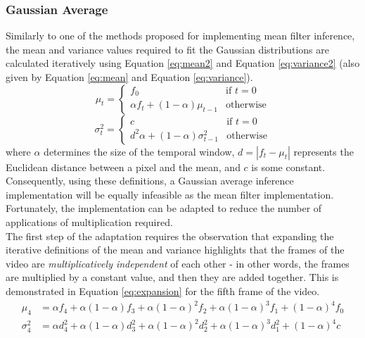 \setlength{\leftskip}{0cm}
\subsubsection{Gaussian Average}
\setlength{\leftskip}{0.5cm}
\indent \indent
Similarly to one of the methods proposed for implementing mean filter inference, the mean and variance values required to fit the Gaussian distributions are calculated iteratively using Equation \ref{eq:mean2} and Equation \ref{eq:variance2} (also given by Equation \ref{eq:mean} and Equation \ref{eq:variance}).
\begin{equation}
    \label{eq:mean2}
    \mu_t =
    \begin{cases}
        f_0 & \text{if $t = 0$} \\
        \alpha f_t + (1 - \alpha) \mu_{t-1} & \text{otherwise}
    \end{cases}
\end{equation}
\begin{equation}
    \label{eq:variance2}
    \sigma^2_t =
    \begin{cases}
        c & \text{if $t = 0$} \\
        d^2 \alpha + (1 - \alpha) \sigma^2_{t-1} & \text{otherwise}
    \end{cases}
\end{equation}
where $\alpha$ determines the size of the temporal window, $d = |f_t - \mu_t|$ represents the Euclidean distance between a pixel and the mean, and $c$ is some constant.
\smallskip \\ \indent
Consequently, using these definitions, a Gaussian average inference implementation will be equally infeasible as the mean filter implementation. Fortunately, the implementation can be adapted to reduce the number of applications of multiplication required.   
\smallskip \\ \indent
The first step of the adaptation requires the observation that expanding the iterative definitions of the mean and variance highlights that the frames of the video are \textit{multiplicatively independent} of each other - in other words, the frames are multiplied by a constant value, and then they are added together. This is demonstrated in Equation \ref{eq:expansion} for the fifth frame of the video.
\begin{equation}
    \label{eq:expansion}
    \begin{split}
        \mu_4 &= \alpha f_4 + \alpha (1-\alpha) f_3 + \alpha (1-\alpha)^2 f_2 + \alpha (1-\alpha)^3 f_1 + (1-\alpha)^4 f_0 \\ 
        \sigma^2_4 &= \alpha d^2_4 + \alpha (1-\alpha) d^2_3  + \alpha (1-\alpha)^2 d^2_2 + \alpha (1-\alpha)^3 d^2_1 + (1-\alpha)^4 c
    \end{split}
\end{equation}

